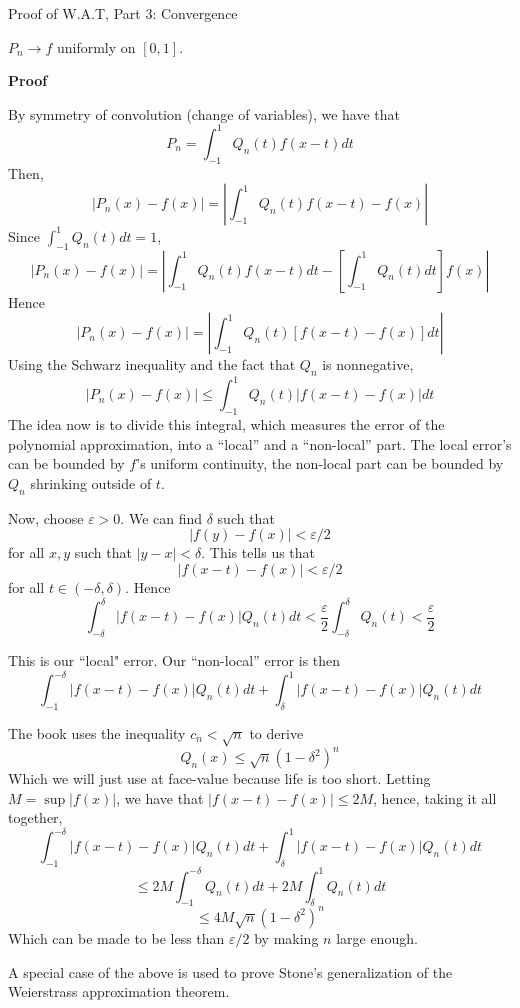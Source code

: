 \begin{theorem} Proof of W.A.T, Part 3: Convergence

    $P_n \rightarrow f$ uniformly on $[0, 1]$.

    \textbf{Proof}
    
    By symmetry of convolution (change of variables), we have that
    \[P_n = \int_{-1}^1 Q_n(t)f(x-t)dt\]
    Then,
    \[|P_n(x) - f(x)| = \left|\int_{-1}^1 Q_n(t) f(x-t) - f(x)\right|\] 
    Since $\int_{-1}^1 Q_n(t)dt = 1$,
\[|P_n(x) - f(x)| =\left|\int_{-1}^1 Q_n(t)f(x-t) dt - \left[\int_{-1}^1 Q_n(t)dt\right]f(x)\right|\]
Hence
\[|P_n(x) - f(x)| =\left|\int_{-1}^1 Q_n(t)[f(x-t)-f(x)] dt\right|\]
Using the Schwarz inequality and the fact that $Q_n$ is nonnegative, 
\[|P_n(x) - f(x)| \leq \int_{-1}^1 Q_n(t)\big|f(x-t)-f(x)\big| dt\]
The idea now is to divide this integral, which measures the error of the polynomial approximation, into a ``local'' and a ``non-local'' part. The local error's can be bounded by $f$'s uniform continuity, the non-local part can be bounded by $Q_n$ shrinking outside of $t$.

Now, choose $\varepsilon > 0$. We can find $\delta$ such that 
\[|f(y) - f(x)| < \varepsilon/2\]
for all $x, y$ such that $|y-x| < \delta$. This tells us that 
\[|f(x-t) - f(x)| < \varepsilon/2\]
for all $t \in (-\delta, \delta)$. Hence
\[\int_{-\delta}^\delta |f(x-t) - f(x)| Q_n(t) dt < \frac{\varepsilon}{2}\int_{-\delta}^\delta Q_n(t) < \frac{\varepsilon}{2}\]

This is our ``local" error. Our ``non-local'' error is then
\[\int_{-1}^{-\delta} |f(x-t)-f(x)|Q_n(t)dt + \int_{\delta}^1 |f(x-t)-f(x)|Q_n(t)dt\]
\end{theorem}

\begin{proposition}
    The book uses the inequality $c_n < \sqrt{n}$ to derive
    \[Q_n(x) \leq \sqrt{n}(1-\delta^2)^n\]
    Which we will just use at face-value because life is too short. Letting $M = \sup |f(x)|$, we have that $|f(x-t) - f(x)| \leq 2M$, hence, taking it all together, 
\[\int_{-1}^{-\delta} |f(x-t)-f(x)|Q_n(t)dt + \int_{\delta}^1 |f(x-t)-f(x)|Q_n(t)dt\]
\[\leq 2M \int_{-1}^{-\delta}Q_n(t)dt + 2M \int_{\delta}^{1}Q_n(t)dt\]
\[\leq 4M \sqrt{n}(1-\delta^2)^n\]
Which can be made to be less than $\varepsilon/2$ by making $n$ large enough.
\end{proposition}

A special case of the above is used to prove Stone's generalization of the Weierstrass approximation theorem.

